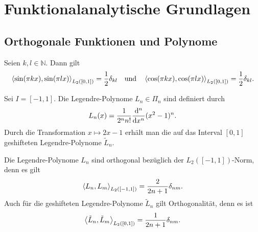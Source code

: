 
\chapter{Funktionalanalytische Grundlagen} %
\label{cha:funktionalanalytische_grundlagen}

\section{Orthogonale Funktionen und Polynome}
\label{sec:orthogonale_funktionen_und_polynome}

\begin{Satz}
\label{satz:trigonometrische_funktionen_orthogonal}
    Seien $k, l \in \mathbb{N}$.
    Dann gilt
    \begin{align}
        \left\langle\sin(\pi k x),\sin(\pi l x)\right\rangle_{L_{2}([0, 1])} = \frac{1}{2} \delta_{kl}
        \quad\text{und}\quad
        \left\langle\cos(\pi k x),\cos(\pi l x)\right\rangle_{L_{2}([0, 1])} = \frac{1}{2} \delta_{kl}.
    \end{align}
\end{Satz}

\begin{Definition}
\label{definition:legendre_polynome}
    Sei $I = [-1, 1]$.
    Die Legendre-Polynome $L_{n} \in \Pi_{n}$ sind definiert durch
    \begin{equation}
        L_{n}(x) = \frac{1}{2^{n}n!}\frac{\mathop{}\!\mathrm{d}^{n}}{\mathop{}\!\mathrm{d} x^{n}} (x^{2} - 1)^{n}.
    \end{equation}
    Durch die Transformation $x \mapsto 2x - 1$ erhält man die auf das Interval $[0, 1]$ geshifteten Legendre-Polynome $\tilde L_{n}$.
\end{Definition}

\begin{Satz}
\label{satz:legendre_polynome_orthogonal}
    Die Legendre-Polynome $L_{n}$ sind orthogonal bezüglich der $L_{2}([-1, 1])$-Norm, denn es gilt
    \begin{equation}
        \left\langle L_{n},L_{m}\right\rangle_{L_{2}([-1, 1])} = \frac{2}{2n + 1} \delta_{n m}.
    \end{equation}
    Auch für die geshifteten Legendre-Polynome $\tilde L_{n}$ gilt Orthogonalität, denn es ist
    \begin{equation}
        \left\langle\tilde L_{n},\tilde L_{m}\right\rangle_{L_{2}([0, 1])} = \frac{1}{2n + 1} \delta_{n m}.
    \end{equation}
\end{Satz}

